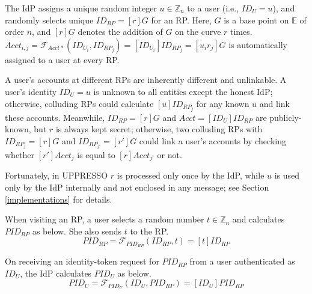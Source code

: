 The IdP assigns a unique random integer $u \in \mathbb{Z}_n$ to a user (i.e., $ID_U = u$),
 and randomly selects unique $ID_{RP} = [r]G$ for an RP. %
Here, $G$ is a base point on $\mathbb{E}$ of order $n$, and $[r]G$ denotes the addition of $G$ on the curve $r$ times.
$Acct_{i,j} = \mathcal{F}_{Acct\ast}(ID_{U_i}, ID_{RP_j})= [ID_{U_i}]ID_{RP_j} =[u_ir_j]G$ is automatically assigned to a user at every RP.

A user's accounts at different RPs are inherently different and unlinkable.
A user's identity $ID_U = u$ is unknown to all entities except the honest IdP; otherwise, colluding RPs could calculate $[u]ID_{RP_j}$ for any known $u$ and link these accounts.
Meanwhile, $ID_{RP} = [r]G$ and $Acct = [ID_U]ID_{RP}$ are publicly-known,
 but $r$ is always kept secret;
otherwise, two colluding RPs with $ID_{RP_j} = [r]G$ and $ID_{RP_{j'}} = [r']G$ could link a user's accounts by checking whether $[r']Acct_j$ is equal to $[r]Acct_{j'}$ or not.

Fortunately, in UPPRESSO $r$ is processed only once by the IdP,
    while $u$ is used only by the IdP internally and
 not enclosed in any message; see Section \ref{implementations} for details.


 When visiting an RP,
a user selects a random number $t \in \mathbb{Z}_n$
    and calculates $PID_{RP}$ as below. She also sends $t$ to the RP.
\begin{equation}
PID_{RP} = \mathcal{F}_{PID_{RP}}(ID_{RP},t) = [t]{ID_{RP}}
\label{equ:PIDRP}
\end{equation}



On receiving an identity-token request for $PID_{RP}$ from a user authenticated as $ID_U$, the IdP calculates $PID_{U}$ as below.
\begin{equation}
PID_{U} = \mathcal{F}_{PID_U}(ID_U, PID_{RP}) =
  [{ID_U}]{PID_{RP}}
 \label{equ:PIDU}
\end{equation}

